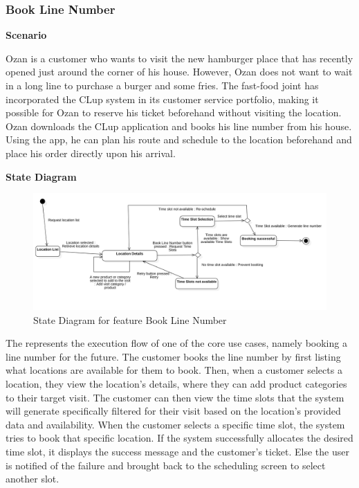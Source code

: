 \subsubsection{Book Line Number}

\textbf{Scenario}

Ozan is a customer who wants to visit the new hamburger place that has recently opened just around the corner of his house.
However, Ozan does not want to wait in a long line to purchase a burger and some fries.
The fast-food joint has incorporated the CLup system in its customer service portfolio, making it possible for Ozan to reserve his ticket beforehand without visiting the location.
Ozan downloads the CLup application and books his line number from his house.
Using the app, he can plan his route and schedule to the location beforehand and place his order directly upon his arrival.

\textbf{State Diagram}

\begin{figure}[H]
    \centering
    \includegraphics[height=0.4\textwidth]{Images/StateCharts/BookLineNumber.png}
    \caption{State Diagram for feature Book Line Number}
    \label{fig:SDBookLine}
\end{figure}

The  represents the execution flow of one of the core use cases, namely booking a line number for the future.
The customer books the line number by first listing what locations are available for them to book.
Then, when a customer selects a location, they view the location's details, where they can add product categories to their target visit.
The customer can then view the time slots that the system will generate specifically filtered for their visit based on the location's provided data and availability.
When the customer selects a specific time slot, the system tries to book that specific location.
If the system successfully allocates the desired time slot, it displays the success message and the customer's ticket.
Else the user is notified of the failure and brought back to the scheduling screen to select another slot.


